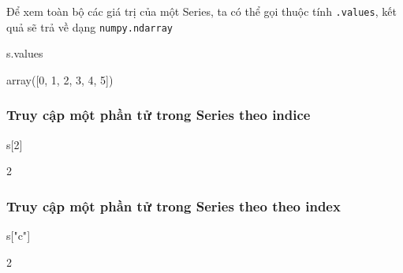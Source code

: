 \documentclass[
]{book}
\newenvironment{Shaded}{\begin{snugshade}}{\end{snugshade}}
\newcommand{\DecValTok}[1]{\textcolor[rgb]{0.00,0.00,0.81}{#1}}
\newcommand{\NormalTok}[1]{#1}
\newcommand{\StringTok}[1]{\textcolor[rgb]{0.31,0.60,0.02}{#1}}
\begin{document}
Để xem toàn bộ các giá trị của một Series, ta có thể gọi thuộc tính \texttt{.values}, kết quả sẽ trả về dạng \texttt{numpy.ndarray}

\begin{Shaded}
\begin{Highlighting}[]
\NormalTok{s.values}
\end{Highlighting}
\end{Shaded}

\begin{Shaded}
\begin{Highlighting}[]
\NormalTok{array([0, 1, 2, 3, 4, 5])}
\end{Highlighting}
\end{Shaded}

\subsubsection*{Truy cập một phần tử trong Series theo indice}\label{truy-cux1eadp-mux1ed9t-phux1ea7n-tux1eed-trong-series-theo-indice}


\begin{Shaded}
\begin{Highlighting}[]
\NormalTok{s[}\DecValTok{2}\NormalTok{]}
\end{Highlighting}
\end{Shaded}

\begin{Shaded}
\begin{Highlighting}[]
\NormalTok{2}
\end{Highlighting}
\end{Shaded}

\subsubsection*{Truy cập một phần tử trong Series theo theo index}\label{truy-cux1eadp-mux1ed9t-phux1ea7n-tux1eed-trong-series-theo-theo-index}


\begin{Shaded}
\begin{Highlighting}[]
\NormalTok{s[}\StringTok{"c"}\NormalTok{]}
\end{Highlighting}
\end{Shaded}

\begin{Shaded}
\begin{Highlighting}[]
\NormalTok{2 }
\end{Highlighting}
\end{Shaded}
\end{document}
